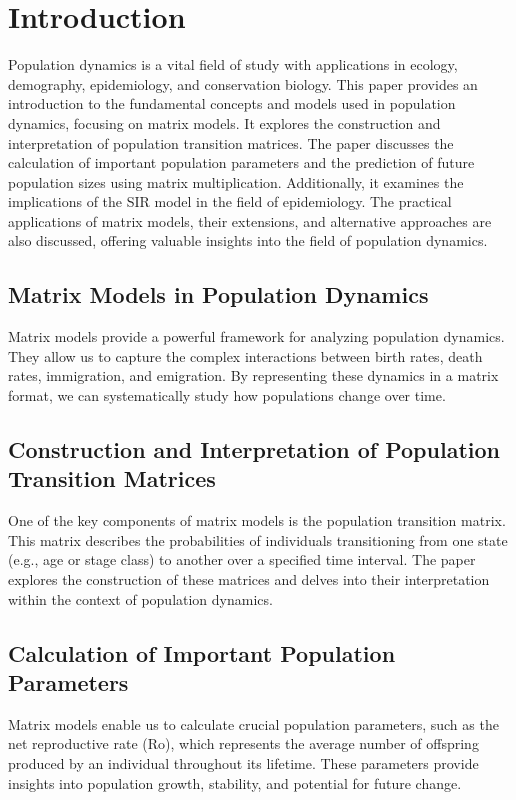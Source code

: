 \documentclass[12pt]{article}
\begin{document}
\section{Introduction}
Population dynamics is a vital field of study with applications in ecology, demography, epidemiology, and conservation biology. This paper provides an introduction to the fundamental concepts and models used in population dynamics, focusing on matrix models. It explores the construction and interpretation of population transition matrices. The paper discusses the calculation of important population parameters and the prediction of future population sizes using matrix multiplication. Additionally, it examines the implications of the SIR model in the field of epidemiology. The practical applications of matrix models, their extensions, and alternative approaches are also discussed, offering valuable insights into the field of population dynamics.

\subsection{Matrix Models in Population Dynamics}
Matrix models provide a powerful framework for analyzing population dynamics. They allow us to capture the complex interactions between birth rates, death rates, immigration, and emigration. By representing these dynamics in a matrix format, we can systematically study how populations change over time.

\subsection{Construction and Interpretation of Population Transition Matrices}
One of the key components of matrix models is the population transition matrix. This matrix describes the probabilities of individuals transitioning from one state (e.g., age or stage class) to another over a specified time interval. The paper explores the construction of these matrices and delves into their interpretation within the context of population dynamics.

\subsection{Calculation of Important Population Parameters}
Matrix models enable us to calculate crucial population parameters, such as the net reproductive rate (Ro), which represents the average number of offspring produced by an individual throughout its lifetime. These parameters provide insights into population growth, stability, and potential for future change.
\end{document}
